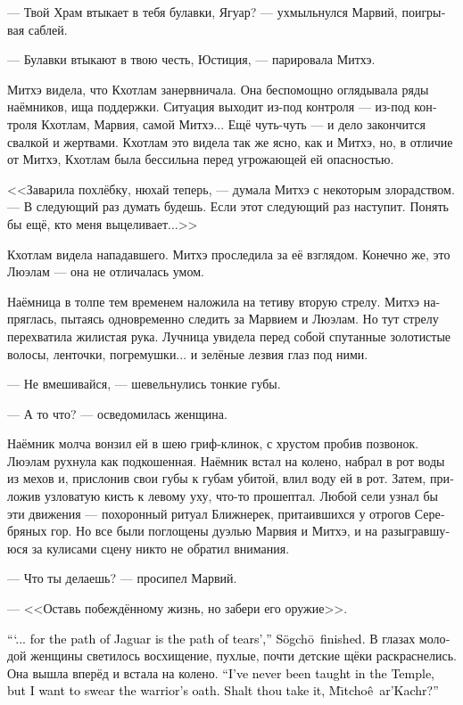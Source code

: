 \documentclass[a4paper,12pt,fleqn]{book}\usepackage{cooltooltips}\usepackage{polyglossia}\setdefaultlanguage{russian}\setotherlanguage{english}\defaultfontfeatures{Ligatures=TeX,Mapping=tex-text} \usepackage{xcolor}\definecolor{lightgray}{HTML}{bbbbbb}\color{lightgray}\newcommand{\ml}[3]{\textenglish{\textcolor{black}{#3}}}
\newcommand{\asterism}{\vspace{1em}{\centering\Large\bfseries$\ast~\ast~\ast$\par}\vspace{1em}}
\newcommand{\Mitchoe}{M\={\i}tcho\^{e}}
\newcommand{\Sogcho}{S\"{o}gch\={o}}
\begin{document}
--- Твой Храм втыкает в тебя булавки, Ягуар? --- ухмыльнулся Марвий, поигрывая саблей.

--- Булавки втыкают в твою честь, Юстиция, --- парировала Митхэ.

Митхэ видела, что Кхотлам занервничала.
Она беспомощно оглядывала ряды наёмников, ища поддержки.
Ситуация выходит из-под контроля --- из-под контроля Кхотлам, Марвия, самой Митхэ...
Ещё чуть-чуть --- и дело закончится свалкой и жертвами.
Кхотлам это видела так же ясно, как и Митхэ, но, в отличие от Митхэ, Кхотлам была бессильна перед угрожающей ей опасностью.

<<Заварила похлёбку, нюхай теперь, --- думала Митхэ с некоторым злорадством.
--- В следующий раз думать будешь.
Если этот следующий раз наступит.
Понять бы ещё, кто меня выцеливает...>>

Кхотлам видела нападавшего.
Митхэ проследила за её взглядом.
Конечно же, это Люэлам --- она не отличалась умом.

Наёмница в толпе тем временем наложила на тетиву вторую стрелу.
Митхэ напряглась, пытаясь одновременно следить за Марвием и Люэлам.
Но тут стрелу перехватила жилистая рука.
Лучница увидела перед собой спутанные золотистые волосы, ленточки, погремушки... и зелёные лезвия глаз под ними.

--- Не вмешивайся, --- шевельнулись тонкие губы.

--- А то что? --- осведомилась женщина.

Наёмник молча вонзил ей в шею гриф-клинок, с хрустом пробив позвонок.
Люэлам рухнула как подкошенная.
Наёмник встал на колено, набрал в рот воды из мехов и, прислонив свои губы к губам убитой, влил воду ей в рот.
Затем, приложив узловатую кисть к левому уху, что-то прошептал.
Любой сели узнал бы эти движения --- похоронный ритуал Ближнерек, притаившихся у отрогов Серебряных гор.
Но все были поглощены дуэлью Марвия и Митхэ, и на разыгравшуюся за кулисами сцену никто не обратил внимания.

\asterism

--- Что ты делаешь? --- просипел Марвий.

--- <<Оставь побеждённому жизнь, но забери его оружие>>.

\ml{$0$}
{--- <<...ибо путь Ягуара --- путь слёз>>, --- закончила Согхо.}
{```... for the path of Jaguar is the path of tears','' \Sogcho\ finished.}
В глазах молодой женщины светилось восхищение, пухлые, почти детские щёки раскраснелись.
Она вышла вперёд и встала на колено.
\ml{$0$}
{--- Меня не обучали в Храме, но я хочу принести воинскую клятву.}
{``I've never been taught in the Temple, but I want to swear the warrior's oath.}
\ml{$0$}
{Примешь ли ты её, Митхэ ар'Кахр?}
{Shalt thou take it, \Mitchoe\ ar'Kachr?''}
\end{document}
